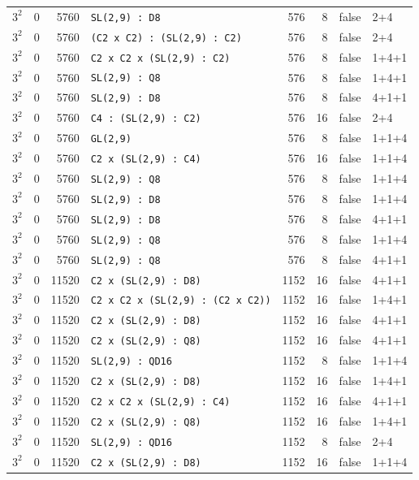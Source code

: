 \begin{longtable}{llrlrrll}
$3^2$ & 0 & 5760 & \texttt{SL(2,9) : D8} & 576 & 8 & false & 2+4\\
$3^2$ & 0 & 5760 & \texttt{(C2 x C2) : (SL(2,9) : C2)} & 576 & 8 & false & 2+4\\
$3^2$ & 0 & 5760 & \texttt{C2 x C2 x (SL(2,9) : C2)} & 576 & 8 & false & 1+4+1\\
$3^2$ & 0 & 5760 & \texttt{SL(2,9) : Q8} & 576 & 8 & false & 1+4+1\\
$3^2$ & 0 & 5760 & \texttt{SL(2,9) : D8} & 576 & 8 & false & 4+1+1\\
$3^2$ & 0 & 5760 & \texttt{C4 : (SL(2,9) : C2)} & 576 & 16 & false & 2+4\\
$3^2$ & 0 & 5760 & \texttt{GL(2,9)} & 576 & 8 & false & 1+1+4\\
$3^2$ & 0 & 5760 & \texttt{C2 x (SL(2,9) : C4)} & 576 & 16 & false & 1+1+4\\
$3^2$ & 0 & 5760 & \texttt{SL(2,9) : Q8} & 576 & 8 & false & 1+1+4\\
$3^2$ & 0 & 5760 & \texttt{SL(2,9) : D8} & 576 & 8 & false & 1+1+4\\
$3^2$ & 0 & 5760 & \texttt{SL(2,9) : D8} & 576 & 8 & false & 4+1+1\\
$3^2$ & 0 & 5760 & \texttt{SL(2,9) : Q8} & 576 & 8 & false & 1+1+4\\
$3^2$ & 0 & 5760 & \texttt{SL(2,9) : Q8} & 576 & 8 & false & 4+1+1\\
$3^2$ & 0 & 11520 & \texttt{C2 x (SL(2,9) : D8)} & 1152 & 16 & false & 4+1+1\\
$3^2$ & 0 & 11520 & \texttt{C2 x C2 x (SL(2,9) : (C2 x C2))} & 1152 & 16 & false & 1+4+1\\
$3^2$ & 0 & 11520 & \texttt{C2 x (SL(2,9) : D8)} & 1152 & 16 & false & 4+1+1\\
$3^2$ & 0 & 11520 & \texttt{C2 x (SL(2,9) : Q8)} & 1152 & 16 & false & 4+1+1\\
$3^2$ & 0 & 11520 & \texttt{SL(2,9) : QD16} & 1152 & 8 & false & 1+1+4\\
$3^2$ & 0 & 11520 & \texttt{C2 x (SL(2,9) : D8)} & 1152 & 16 & false & 1+4+1\\
$3^2$ & 0 & 11520 & \texttt{C2 x C2 x (SL(2,9) : C4)} & 1152 & 16 & false & 4+1+1\\
$3^2$ & 0 & 11520 & \texttt{C2 x (SL(2,9) : Q8)} & 1152 & 16 & false & 1+4+1\\
$3^2$ & 0 & 11520 & \texttt{SL(2,9) : QD16} & 1152 & 8 & false & 2+4\\
$3^2$ & 0 & 11520 & \texttt{C2 x (SL(2,9) : D8)} & 1152 & 16 & false & 1+1+4\\

\end{longtable}
